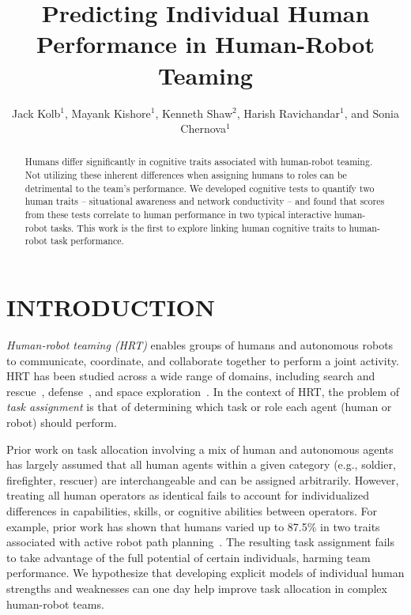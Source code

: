 \documentclass[letterpaper, 10 pt, conference]{ieeeconf}  %
\title{\LARGE \bf
Predicting Individual Human Performance in Human-Robot Teaming
}
\author{Jack Kolb$^{1}$, Mayank Kishore$^{1}$, Kenneth Shaw$^{2}$, Harish Ravichandar$^{1}$, and Sonia Chernova$^{1}$}%
\begin{document}
\maketitle
\thispagestyle{empty}
\pagestyle{empty}


\begin{abstract}

Humans differ significantly in cognitive traits associated with human-robot teaming. Not utilizing these inherent differences when assigning humans to roles can be detrimental to the team’s performance. We developed cognitive tests to quantify two human traits – situational awareness and network conductivity – and found that scores from these tests correlate to human performance in two typical interactive human-robot tasks. This work is the first to explore linking human cognitive traits to human-robot task performance.

\end{abstract}


\section{INTRODUCTION}

\textit{Human-robot teaming (HRT)} enables groups of humans and autonomous robots to communicate, coordinate, and collaborate together to perform a joint activity.  HRT has been studied across a wide range of domains, including search and rescue~\cite{kohlbrecher2015}, defense~\cite{parasuraman2007adaptive}, and space exploration~\cite{fong2005interaction}.  In the context of HRT, the problem of \textit{task assignment} is that of determining which task or role each agent (human or robot) should perform.

Prior work on task allocation involving a mix of human and autonomous agents has largely assumed that all human agents within a given category (e.g., soldier, firefighter, rescuer) are interchangeable and can be assigned arbitrarily.  However, treating all human operators as identical fails to account for individualized differences in capabilities, skills, or cognitive abilities between operators.
For example, prior work has shown that humans varied up to 87.5\% in two traits associated with active robot path planning~\cite{shannon2017human}.
The resulting task assignment fails to take advantage of the full potential of certain individuals, harming team performance.  We hypothesize that developing explicit models of individual human strengths and weaknesses can one day help improve task allocation in complex human-robot teams.
\end{document}

